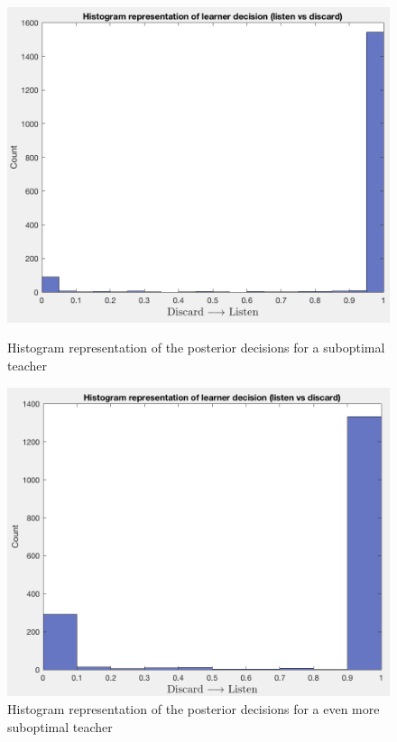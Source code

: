 \documentclass[a4paper]{report}
\begin{document}
{{{{				
				\begin{figure}[ht!]
					\begin{minipage}{0.5\linewidth}
						\begin{center}
							\includegraphics[width=0.95\linewidth]{pos_des_120}
							\caption{Histogram representation of the posterior decisions for a suboptimal teacher}
							\label{fig::post_des_120}
						\end{center}
					\end{minipage}
					\begin{minipage}{0.5\linewidth}
						\begin{center}
							\includegraphics[width=0.95\linewidth]{pos_des_50}
							\caption{Histogram representation of the posterior decisions for a even more suboptimal teacher}
							\label{fig::post_des_50}
						\end{center}
					\end{minipage}
				\end{figure}
				
}}}}
\end{document}
